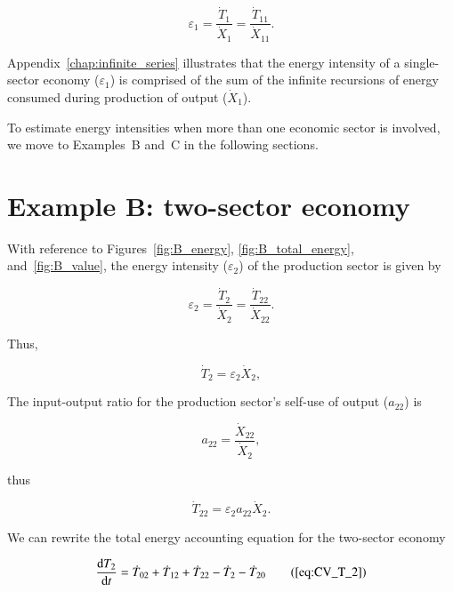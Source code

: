 \begin{equation} \label{eq:A-energy_intensity}
	\varepsilon_{1} 
	= \frac{\dot{T}_{1}}{\dot{X}_{1}} 
	= \frac{\dot{T}_{11}}{\dot{X}_{11}}.
\end{equation}

Appendix~\ref{chap:infinite_series} illustrates that the energy 
intensity of a single-sector economy ($\varepsilon_{1}$) 
is comprised of the sum of the infinite recursions
of energy consumed during production of output ($\dot{X}_{1}$).

To estimate energy intensities
when more than one economic sector is involved, 
we move to Examples~B and~C in the following sections.


\section{Example B: two-sector economy} %

With reference to Figures~\ref{fig:B_energy}, 
\ref{fig:B_total_energy},
and~\ref{fig:B_value}, 
the energy intensity ($\varepsilon_{2}$) 
of the production sector is given by

\begin{equation} \label{eq:single_sector_energy_intensity}
	\varepsilon_{2} 
	= \frac{\dot{T}_{2}}{\dot{X}_{2}} 
	= \frac{\dot{T}_{22}}{\dot{X}_{22}}.
\end{equation}

\noindent{}Thus,

\begin{equation} \label{eq:T_dot_1_single_sector}
	\dot{T}_{2} = \varepsilon_{2}\dot{X}_{2},
\end{equation}

The input-output ratio 
for the production sector's self-use of output ($a_{22}$) is

\begin{equation} \label{eq:io_ratio_single_sector}
	a_{22} = \frac{\dot{X}_{22}}{\dot{X}_{2}},
\end{equation}

\noindent{}thus

\begin{equation} \label{eq:T_dot_11_single_sector}
	\dot{T}_{22} = \varepsilon_{2}a_{22}\dot{X}_{2}.
\end{equation}

We can rewrite the total energy accounting equation 
for the two-sector economy

\begin{equation}
	\frac{\mathrm{d}T_{2}}{\mathrm{d}t} 	 
	= \dot{T}_{02} 
	+ \dot{T}_{12}
	+ \dot{T}_{22} 
	- \dot{T}_{2} 
	- \dot{T}_{20} \tag{\ref{eq:CV_T_2}}
\end{equation}

